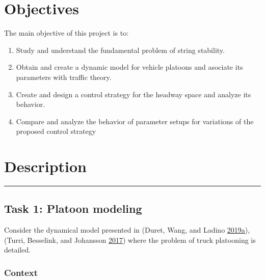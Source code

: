 \documentclass[]{book}
\providecommand{\tightlist}{%
  \setlength{\itemsep}{0pt}\setlength{\parskip}{0pt}}
\theoremstyle{definition}
\theoremstyle{definition}
\theoremstyle{definition}
\theoremstyle{remark}
\begin{document}
\hypertarget{objectives-1}{%
\section*{Objectives}\label{objectives-1}}

The main objective of this project is to:

\begin{enumerate}
\def\labelenumi{\arabic{enumi}.}
\tightlist
\item
  Study and understand the fundamental problem of string stability.
\item
  Obtain and create a dynamic model for vehicle platoons and asociate
  its parameters with traffic theory.
\item
  Create and design a control strategy for the headway space and analyze
  its behavior.
\item
  Compare and analyze the behavior of parameter setups for variations of
  the proposed control strategy
\end{enumerate}

\hypertarget{description-1}{%
\section*{Description}\label{description-1}}

\begin{center}\rule{0.5\linewidth}{\linethickness}\end{center}

\hypertarget{task-1-platoon-modeling}{%
\subsection*{Task 1: Platoon modeling}\label{task-1-platoon-modeling}}

Consider the dynamical model presented in (Duret, Wang, and Ladino
\protect\hyperlink{ref-Duret2019:ISTTT}{2019}\protect\hyperlink{ref-Duret2019:ISTTT}{a}),
(Turri, Besselink, and Johansson
\protect\hyperlink{ref-Turri2017}{2017}) where the problem of truck
platooning is detailed.

\hypertarget{context-5}{%
\subsubsection*{Context}\label{context-5}}
\end{document}

